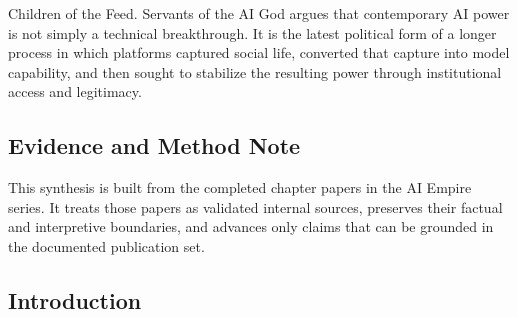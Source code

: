 \documentclass[
  american,
  11pt,
  letterpaper,
]{article}
\begin{document}
Children of the Feed. Servants of the AI God argues that contemporary AI
power is not simply a technical breakthrough. It is the latest political
form of a longer process in which platforms captured social life,
converted that capture into model capability, and then sought to
stabilize the resulting power through institutional access and
legitimacy.

\subsection{Evidence and Method Note}\label{evidence-and-method-note}

This synthesis is built from the completed chapter papers in the AI
Empire series. It treats those papers as validated internal sources,
preserves their factual and interpretive boundaries, and advances only
claims that can be grounded in the documented publication set.

\subsection{Introduction}\label{introduction}
\end{document}
